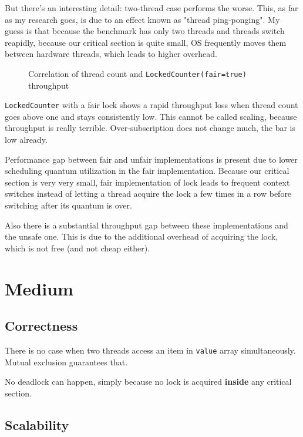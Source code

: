 \documentclass[a4paper,12pt]{article}
\begin{document}
But there's an interesting detail: two-thread case performs the worse. This, as far as my research goes, is due to an effect known as "thread ping-ponging". My guess is that because the benchmark has only two threads and threads switch reapidly, because our critical section is quite small, OS frequently moves them between hardware threads, which leads to higher overhead.

\begin{figure}[!htb]
\begin{center}

\cprotect\caption{Correlation of thread count and \verb|LockedCounter(fair=true)| throughput}
\end{center}
\end{figure}

\verb|LockedCounter| with a fair lock shows a rapid throughput loss when thread count goes above one and stays consistently low. This cannot be called scaling, because throughput is really terrible. Over-subscription does not change much, the bar is low already.

Performance gap between fair and unfair implementations is present due to lower scheduling quantum utilization in the fair implementation. Because our critical section is very very small, fair implementation of lock leads to frequent context switches instead of letting a thread acquire the lock a few times in a row before switching after its quantum is over.

Also there is a substantial throughput gap between these implementations and the unsafe one. This is due to the additional overhead of acquiring the lock, which is not free (and not cheap either).

\section*{Medium}

\subsection*{Correctness}

There is no case when two threads access an item in \verb|value| array simultaneously. Mutual exclusion guarantees that.

No deadlock can happen, simply because no lock is acquired \textbf{inside} any critical section.

\subsection*{Scalability}
\end{document}

